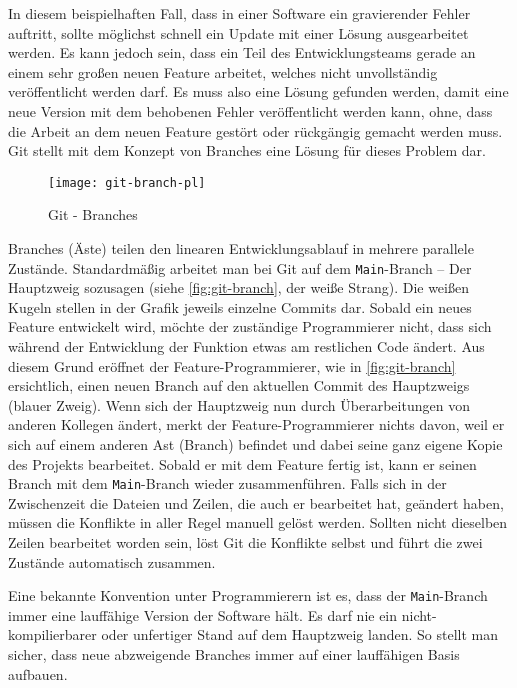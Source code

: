 In diesem beispielhaften Fall, dass in einer Software ein gravierender Fehler
auftritt, sollte möglichst schnell ein Update mit einer Lösung ausgearbeitet
werden. Es kann jedoch sein, dass ein Teil des Entwicklungsteams gerade an einem
sehr großen neuen Feature arbeitet, welches nicht unvollständig veröffentlicht
werden darf. Es muss also eine Lösung gefunden werden, damit eine neue Version
mit dem behobenen Fehler veröffentlicht werden kann, ohne, dass die Arbeit an
dem neuen Feature gestört oder rückgängig gemacht werden muss. Git stellt mit
dem Konzept von Branches eine Lösung für dieses Problem dar.

\vspace{16pt}
\begin{figure}[h]
    \centering
    \texttt{[image: git-branch-pl]}
    \caption{Git - Branches}
    \label{fig:git-branch}
\end{figure}
\vspace{16pt}

Branches (Äste) teilen den linearen Entwicklungsablauf in mehrere parallele
Zustände. Standardmäßig arbeitet man bei Git auf dem \texttt{Main}-Branch -- Der
Hauptzweig sozusagen (siehe \autoref{fig:git-branch}, der weiße Strang).
Die weißen Kugeln stellen in der Grafik jeweils einzelne Commits dar. Sobald ein
neues Feature entwickelt wird, möchte der zuständige Programmierer nicht, dass
sich während der Entwicklung der Funktion etwas am restlichen Code ändert. Aus
diesem Grund eröffnet der Feature-Programmierer, wie in \autoref{fig:git-branch}
ersichtlich, einen neuen Branch auf den aktuellen Commit des Hauptzweigs (blauer
Zweig). Wenn sich der Hauptzweig nun durch Überarbeitungen von anderen Kollegen
ändert, merkt der Feature-Programmierer nichts davon, weil er sich auf einem
anderen Ast (Branch) befindet und dabei seine ganz eigene Kopie des Projekts
bearbeitet. Sobald er mit dem Feature fertig ist, kann er seinen Branch mit dem
\texttt{Main}-Branch wieder zusammenführen. Falls sich in der Zwischenzeit die
Dateien und Zeilen, die auch er bearbeitet hat, geändert haben, müssen die
Konflikte in aller Regel manuell gelöst werden. Sollten nicht dieselben Zeilen
bearbeitet worden sein, löst Git die Konflikte selbst und führt die zwei
Zustände automatisch zusammen.

Eine bekannte Konvention unter Programmierern ist es, dass der
\texttt{Main}-Branch immer eine lauffähige Version der Software hält. Es darf
nie ein nicht-kompilierbarer oder unfertiger Stand auf dem Hauptzweig landen.
So stellt man sicher, dass neue abzweigende Branches immer auf einer
lauffähigen Basis aufbauen. \parencite{git-branches}

